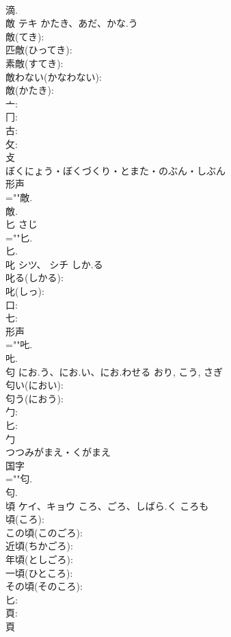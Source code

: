 \documentclass[8pt]{extreport}
\begin{document}
\begin{CJK}{UTF8}{min}
\\	滴.
\\	敵	テキ	かたき、あだ、かな.う		
\\	敵(てき): 
\\	匹敵(ひってき): 
\\	素敵(すてき): 
\\	敵わない(かなわない): 
\\	敵(かたき): 
\\	亠: 
\\	冂: 
\\	古: 
\\	攵: 
\\	攴	
\\	ぼくにょう・ぼくづくり・とまた・のぶん・しぶん	
\\	形声 
\\	=""敵.
\\	敵.
\\	匕		さじ				
\\	=""匕.
\\	匕.
\\	叱	シツ、 シチ	しか.る		
\\	叱る(しかる): 
\\	叱(しっ): 
\\	口: 
\\	七: 
\\	形声 
\\	=""𠮟.
\\	𠮟.
\\	匂		にお.う、にお.い、にお.わせる	おり, こう, さぎ	
\\	匂い(におい): 
\\	匂う(におう): 
\\	勹: 
\\	匕: 
\\	勹	
\\	つつみがまえ・くがまえ	
\\	国字 
\\	=""匂.
\\	匂.
\\	頃	ケイ、キョウ	ころ、ごろ、しばら.く	ころも	
\\	頃(ころ): 
\\	この頃(このごろ): 
\\	近頃(ちかごろ): 
\\	年頃(としごろ): 
\\	一頃(ひところ): 
\\	その頃(そのころ): 
\\	匕: 
\\	頁: 
\\	頁	

\end{CJK}
\end{document}

